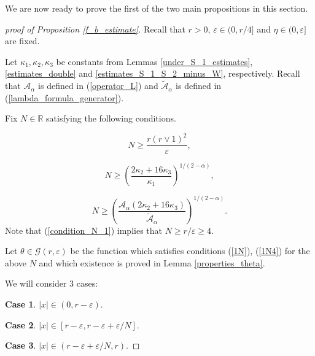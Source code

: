 \documentclass[a4paper,12pt,reqno]{amsart}
\theoremstyle{definition}
\theoremstyle{remark}
\newcommand{\eps}{\varepsilon}
\newcommand{\calA}{\mathcal{A}}
\newcommand{\calG}{\mathcal{G}}
\newcommand{\R}{\mathds{R}}
\begin{document}
We are now ready to prove the first of the two main propositions in this section.
\begin{proof}[proof of Proposition \ref{f_b_estimate}]
Recall that $r > 0$, $\eps \in (0,r/4]$ and $\eta \in (0,\eps]$ are fixed.

Let $\kappa_1, \kappa_2, \kappa_3$ be constants from Lemmas \ref{under_S_1_estimates}, \ref{estimates_double} and \ref{estimates_S_1_S_2_minus_W}, respectively. Recall that $\calA_{\alpha}$ is defined in (\ref{operator_L}) and $\tilde{\calA}_{\alpha}$ is defined in (\ref{lambda_formula_generator}).

Fix $N \in \R$ satisfying the following conditions.

\begin{equation}
\label{condition_N_1}
N \ge \frac{r(r \vee 1)^2}{\eps},
\end{equation}

\begin{equation}
\label{condition_N_2}
N \ge \left(\frac{2\kappa_2 + 16 \kappa_3}{\kappa_1}\right)^{1/(2-\alpha)},
\end{equation}

\begin{equation}
\label{condition_N_3}
N \ge \left(\frac{\calA_\alpha (2\kappa_2 + 16 \kappa_3)}{\tilde{\calA}_{\alpha}}\right)^{1/(2-\alpha)}.
\end{equation}
Note that (\ref{condition_N_1}) implies that $N \ge r/\eps \ge 4$.

Let $\theta \in \calG(r,\eps)$ be the function which satisfies conditions (\ref{1N}), (\ref{1N4}) for the above $N$ and which existence is proved in Lemma \ref{properties_theta}.%

We will consider 3 cases:

{\bf Case 1}. $|x| \in (0, r - \eps)$.

{\bf Case 2}. $|x| \in [r -\eps, r - \eps + \eps/N]$.

{\bf Case 3}. $|x| \in (r - \eps + \eps/N, r)$.


\end{proof}
\end{document}
